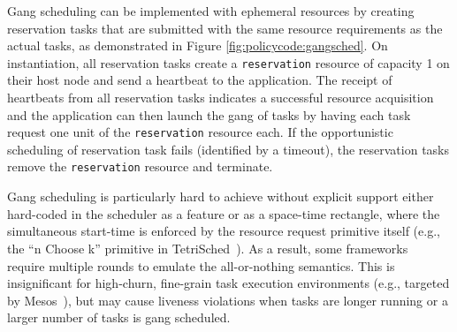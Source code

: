 Gang scheduling can be implemented with ephemeral resources by creating reservation tasks that are submitted with the same resource requirements as the actual tasks, as demonstrated in Figure \ref{fig:policycode:gangsched}. On instantiation, all reservation tasks create a \lstinline{reservation} resource of capacity 1 on their host node and send a heartbeat to the application. The receipt of heartbeats from all reservation tasks indicates a successful resource acquisition and the application can then launch the gang of tasks by having each task request one unit of the \lstinline{reservation} resource each. If the opportunistic scheduling of reservation task fails (identified by a timeout), the reservation tasks remove the \lstinline{reservation} resource and terminate.


  
Gang scheduling is particularly hard to achieve without explicit support either hard-coded in the scheduler as a feature or as a space-time rectangle, where the simultaneous start-time is enforced by the resource request primitive itself (e.g., the ``n Choose k'' primitive in TetriSched~\cite{tetrisched}). As a result, some frameworks~\cite{mesos, firmament} require multiple rounds to emulate the all-or-nothing semantics. This is insignificant for high-churn, fine-grain task execution environments (e.g., targeted by Mesos~\cite{mesos}), but may cause liveness violations when tasks are longer running or a larger number of tasks is gang scheduled.

